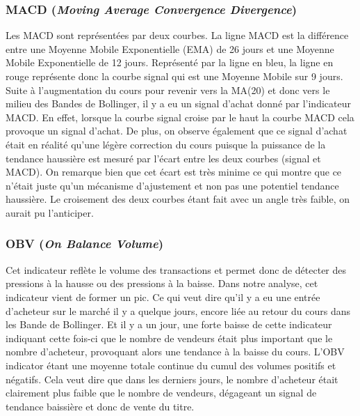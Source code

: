 \documentclass[12pt,a4paper]{article}
\begin{document}
\subsubsection*{MACD (\textit{Moving Average Convergence Divergence})}
Les MACD sont représentées par deux courbes. La ligne MACD est la différence entre une Moyenne Mobile Exponentielle (EMA) de 26 jours et une Moyenne Mobile Exponentielle 
de 12 jours. Représenté par la ligne en bleu, la ligne en rouge représente donc la courbe signal qui est une Moyenne Mobile sur 9 jours.\\
Suite à l'augmentation du cours pour revenir vers la MA(20) et donc vers le milieu des Bandes de Bollinger, il y a eu un signal d'achat donné par l'indicateur MACD. En 
effet, lorsque la courbe signal croise par le haut la courbe MACD cela provoque un signal d'achat. De plus, on observe également que ce signal d'achat était en réalité 
qu'une légère correction du cours puisque la puissance de la tendance haussière est mesuré par l'écart entre les deux courbes (signal et MACD). On remarque bien que cet 
écart est très minime ce qui montre que ce n'était juste qu'un mécanisme d'ajustement et non pas une potentiel tendance haussière. Le croisement des deux courbes étant 
fait avec un angle très faible, on aurait pu l'anticiper. 
\subsubsection*{OBV (\textit{On Balance Volume})} 
Cet indicateur reflète le volume des transactions et permet donc de détecter des pressions à la hausse ou des pressions à la baisse. Dans notre analyse, cet indicateur 
vient de former un pic. Ce qui veut dire qu'il y a eu une entrée d'acheteur sur le marché il y a quelque jours, encore liée au retour du cours dans les Bande de Bollinger. 
Et il y a un jour, une forte baisse de cette indicateur indiquant cette fois-ci que le nombre de vendeurs était plus important que le nombre d'acheteur, provoquant alors 
une tendance à la baisse du cours. L'OBV indicator étant une moyenne totale continue du cumul des volumes positifs et négatifs. Cela veut dire que dans les derniers jours, 
le nombre d'acheteur était clairement plus faible que le nombre de vendeurs, dégageant un signal de tendance baissière et donc de vente du titre.
\end{document}
